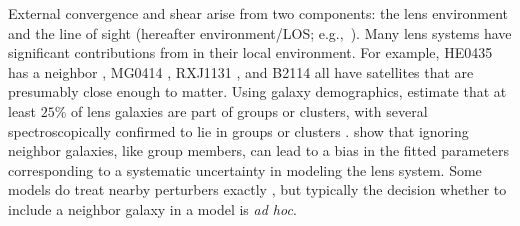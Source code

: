External convergence and shear arise from two components: the lens environment and the line of sight (hereafter environment/LOS; e.g.,\ \citealt{Jaroszynski14,Seljak94,Bar-Kana96,Keeton97}). Many lens systems have significant contributions from in their local environment. For example, HE0435 has a neighbor \citep{Kochanek06}, MG0414 \citep{Tonry99}, RXJ1131 \citep{Sluse03}, and B2114 \citep{King99} all have satellites that are presumably close enough to matter. Using galaxy demographics, \citet{Keeton00} estimate that at least $25\%$ of lens galaxies are part of groups or clusters, with several spectroscopically confirmed to lie in groups or clusters \citep[][and references therein]{Momcheva06}. \citet{Keeton04} show that ignoring neighbor galaxies, like group members, can lead to a bias in the fitted  parameters corresponding to a systematic uncertainty in modeling the lens system. Some models do treat nearby perturbers exactly \citep[e.g.][]{Fadely12}, but typically the decision whether to include a neighbor galaxy in a model is \textit{ad hoc}.